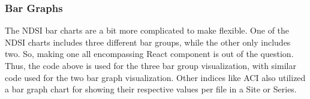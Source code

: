 \subsubsection{Bar Graphs}


The NDSI bar charts are a bit more complicated to make flexible. One of the NDSI charts includes three different bar groups, while the other only includes two. So, making one all encompassing React component is out of the question. Thus, the code above is used for the three bar group visualization, with similar code used for the two bar graph visualization. Other indices like ACI also utilized a bar graph chart for showing their respective values per file in a Site or Series.
